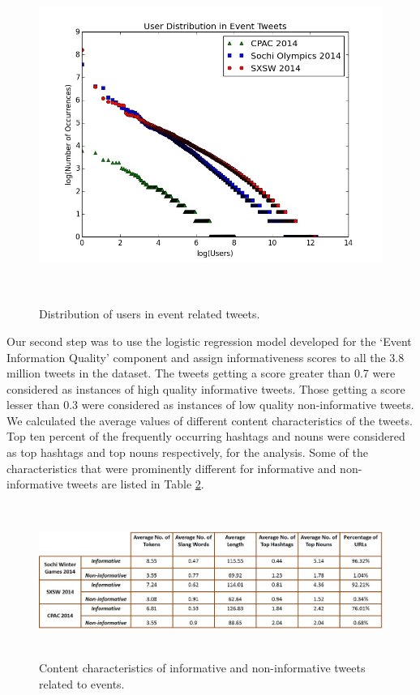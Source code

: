 \begin{figure}[htbp]
  \caption{Distribution of users in event related tweets.}
\label{userdist}
  \centering
    \includegraphics[width=14cm,height=11cm]{Figures/UserDistribution.jpeg}
\end{figure}



Our second step was to use the logistic regression model developed for the `Event Information Quality' component and assign informativeness scores to all the 3.8 million tweets in the dataset. The tweets getting a score greater than 0.7 were considered as instances of high quality informative tweets. Those getting a score lesser than 0.3 were considered as instances of low quality non-informative tweets. We calculated the average values of different content characteristics of the tweets. Top ten percent of the frequently occurring hashtags and nouns were considered as top hashtags and top nouns respectively, for the analysis. Some of the characteristics that were prominently different for informative and non-informative tweets are listed in Table \ref{infoanalysis}.

\begin{figure}[htbp]
\centering
\caption{Content characteristics of informative and non-informative tweets related to events.}
    \includegraphics[width=15cm,height=5cm]{Figures/InformationAnalysisTable.jpg}
    
    \label{infoanalysis}
\end{figure}

